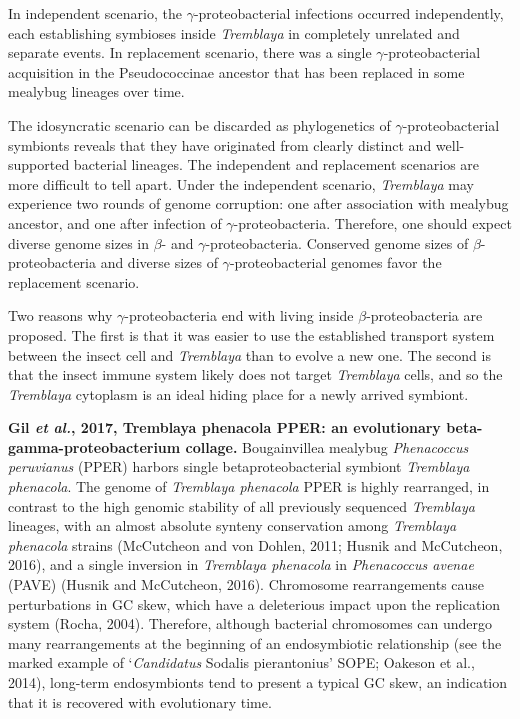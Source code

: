 \documentclass[11pt]{article}
\begin{document}
\begin{sloppypar}
In independent scenario, the $\gamma$-proteobacterial infections occurred independently, each establishing symbioses inside \textit{Tremblaya} in completely unrelated and separate events. 
In replacement scenario, there was a single $\gamma$-proteobacterial acquisition in the Pseudococcinae ancestor that has been replaced in some mealybug lineages over time. 
\par
The idosyncratic scenario can be discarded as phylogenetics of $\gamma$-proteobacterial symbionts reveals that they have originated from clearly distinct and well-supported bacterial lineages. 
The independent and replacement scenarios are more difficult to tell apart. 
Under the independent scenario, \textit{Tremblaya} may experience two rounds of genome corruption: one after association with mealybug ancestor, and one after infection of $\gamma$-proteobacteria. 
Therefore, one should expect diverse genome sizes in $\beta$- and $\gamma$-proteobacteria. 
Conserved genome sizes of $\beta$-proteobacteria and diverse sizes of $\gamma$-proteobacterial genomes favor the replacement scenario. 
\par
Two reasons why $\gamma$-proteobacteria end with living inside $\beta$-proteobacteria are proposed. 
The first is that it was easier to use the established transport system between the insect cell and \textit{Tremblaya} than to evolve a new one. 
The second is that the insect immune system likely does not target \textit{Tremblaya} cells, and so the \textit{Tremblaya} cytoplasm is an ideal hiding place for a newly arrived symbiont.
\par
\textbf{Gil \textit{et al.}, 2017, Tremblaya phenacola PPER: an evolutionary beta-gamma-proteobacterium collage.} \newline
Bougainvillea mealybug \textit{Phenacoccus peruvianus} (PPER) harbors single betaproteobacterial symbiont \textit{Tremblaya phenacola}. 
The genome of \textit{Tremblaya phenacola} PPER is highly rearranged, in contrast to the high genomic stability of all previously sequenced \textit{Tremblaya} lineages, with an almost absolute synteny conservation among \textit{Tremblaya phenacola} strains (McCutcheon and von Dohlen, 2011; Husnik and McCutcheon, 2016), and a single inversion in \textit{Tremblaya phenacola} in \textit{Phenacoccus avenae} (PAVE) (Husnik and McCutcheon, 2016). 
Chromosome rearrangements cause perturbations in GC skew, which have a deleterious impact upon the replication system (Rocha, 2004). 
Therefore, although bacterial chromosomes can undergo many rearrangements at the beginning of an endosymbiotic relationship (see the marked example of ‘\textit{Candidatus} Sodalis pierantonius’ SOPE; Oakeson et al., 2014), long-term endosymbionts tend to present a typical GC skew, an indication that it is recovered with evolutionary time. 

\end{sloppypar}
\end{document}
